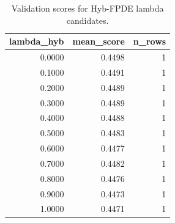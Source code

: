 \begin{table}[t]
\caption{Validation scores for Hyb-FPDE lambda candidates.}
\label{tab:lambda_distribution_computed}
\centering
\begin{tabular}{rrr}
\toprule
lambda\_hyb & mean\_score & n\_rows \\
\midrule
0.0000 & 0.4498 & 1 \\
0.1000 & 0.4491 & 1 \\
0.2000 & 0.4489 & 1 \\
0.3000 & 0.4489 & 1 \\
0.4000 & 0.4488 & 1 \\
0.5000 & 0.4483 & 1 \\
0.6000 & 0.4477 & 1 \\
0.7000 & 0.4482 & 1 \\
0.8000 & 0.4476 & 1 \\
0.9000 & 0.4473 & 1 \\
1.0000 & 0.4471 & 1 \\
\bottomrule
\end{tabular}

\end{table}
